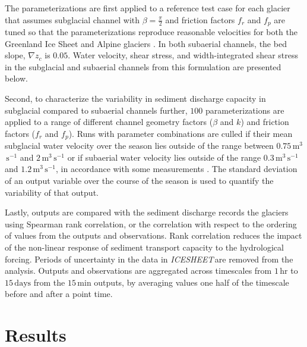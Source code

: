 \documentclass[11pt]{article}
\newcommand{\mauro}[1]{{\textbf{\color{green}Mauro says:} \color{green} #1} }
\newcommand{\icesheet}{\textit{ICESHEET}\,}
\newcommand{\unit}[1]{$\mathrm{#1}$}
\begin{document}
The parameterizations are first applied to a reference test case for each glacier that assumes  subglacial channel with $\beta=\frac{\pi}{2}$ and friction factors $f_r$ and $f_p$ are tuned so that the parameterizations reproduce reasonable velocities for both  the Greenland Ice Sheet and Alpine glaciers \citep[$\sim\,1.6\,$\unit{m}$^3$\,\unit{s}$^{-1}$][]{werder2010b,chandler2013}.
In both subaerial channels, the bed slope, $\nabla z_c$ is $0.05$.
Water velocity, shear stress, and width-integrated shear stress in the subglacial and subaerial channels from this formulation are presented below.

Second, to characterize the variability in sediment discharge capacity in subglacial compared to subaerial channels further, $100$  parameterizations are applied to a range of different channel geometry factors ($\beta$ and $k$) and friction factors ($f_r$ and $f_p$).
Runs with parameter combinations are culled if their mean subglacial water velocity over the season lies outside of the range between $0.75$\,\unit{m}$^3$\,\unit{s}$^{-1}$ and $2$\,\unit{m}$^3$\,\unit{s}$^{-1}$ or if subaerial water velocity lies outside of the range $0.3$\,\unit{m}$^3$\,\unit{s}$^{-1}$ and $1.2$\,\unit{m}$^3$\,\unit{s}$^{-1}$, in accordance with some measurements \citep[e.g.][]{werder2010b,magnusson2012,chandler2013}.
The standard deviation of an output variable over the course of the season is used to quantify the variability of that output.

Lastly,  outputs are compared with the sediment discharge records the glaciers using Spearman rank correlation, or the correlation with respect to the ordering of values from the outputs and observations.
Rank correlation reduces the impact of the non-linear response of sediment transport capacity to the hydrological forcing.
Periods of uncertainty in the data in \icesheet are removed from the analysis.
Outputs and observations are aggregated across timescales from $1$\,\unit{hr} to $15$\,\unit{days} from the $15$\,\unit{min} outputs, by averaging values one half of the timescale before and after a point time.


\section{Results}
\end{document}
